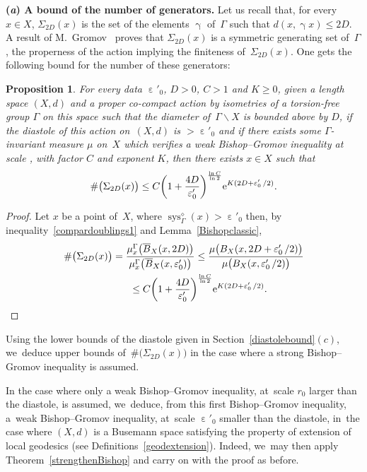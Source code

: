 \documentclass[10pt,a4paper]{amsart}
\numberwithin{equation}{section}
\newtheorem{prop}[theor]{Proposition}
\newcommand{\sys}{\operatorname{sys}}
\newcommand{\g}{\operatorname{\gamma}}
\newcommand{\e}{\operatorname{\varepsilon}}
\begin{document}
\medskip\noindent
{\bf (\emph{a}) A bound of the number of generators.}
Let us recall that, for every $x \in X$, $\Sigma_{2 D} (x)$ is the set of
the elements $\g$ of~$\Gamma$ such that $d(x, \g x) \le 2 D$. A result of M.~Gromov~\cite[Proposition~3.22]{Gr1} proves that $\Sigma_{2 D} (x)$ is a symmetric generating set of~$\Gamma $, the properness of
the action implying the finiteness of~$\Sigma_{2 D} (x) $. One gets the following bound for the number of these generators:

\begin{prop}%
For every data $\e'_0$, $D >0$, $C > 1 $ and $K\ge 0$, given a length space
$(X,d)$ and a proper co-compact action by isometries of a torsion-free group
$\Gamma $ on this space such that the diameter of~$\Gamma \backslash X$ is bounded above by $D$, if the diastole of this action
on~$(X,d)$ is $ > \e'_0$ and if there exists some
$\Gamma$-invariant measure $\mu$ on~$X$ which verifies a weak Bishop--Gromov inequality at scale \smash{$\frac{\e'_0}{2}$}, with factor $C$ and exponent $K$, then
there exists $x \in X$ such that
\begin{gather*}
 \# \big( \Sigma_{2 D} (x) \big) \le C \bigg(1 + \dfrac{4 D }{\e'_0}\bigg)^{\frac{\ln C}{\ln 2}} {\rm e}^{K (2 D + \e'_0/2)}.
 \end{gather*}
\end{prop}

\begin{proof}
Let $x$ be a point of~$X$, where $\sys^{\diamond}_\Gamma (x) > \e'_0$ then, by inequality~\eqref{compardoublings1} and Lemma~\ref{Bishopclassic},
\begin{gather*}
\# \big( \Sigma_{2 D} (x) \big) = \dfrac{\mu_{x}^{\Gamma} \big( \overline B_X (x, 2 D) \big)}{\mu_{x}^{\Gamma} \big( \overline B_X (x, \e'_0) \big)} \le \dfrac{\mu \big( B_X (x, 2 D + \e'_0/2) \big)}{\mu \big( B_X (x, \e'_0/2) \big)}
\\ \hphantom{\# \big( \Sigma_{2 D} (x) \big)}
{}\le C \bigg(1 + \dfrac{4 D }{\e'_0}\bigg)^{\frac{\ln C}{\ln 2}} {\rm e}^{K (2 D + \e'_0/2)}.
\tag*{\qed}
\end{gather*}
\renewcommand{\qed}{}
\end{proof}

Using the lower bounds of the diastole given in Section~\ref{diastolebound}$(c)$, we~deduce upper bounds of~$\# \big(\Sigma_{2 D} (x) \big) $ in
the case where a strong Bishop--Gromov inequality is assumed.

In the case where only a weak Bishop--Gromov inequality, at~scale $r_0 $ larger than the diastole, is assumed, we~deduce, from this first Bishop--Gromov inequality, a~weak Bishop--Gromov inequality, at~scale $\e'_0 $ smaller than the diastole, in~the case where $(X,d)$ is a Busemann space satisfying the property of extension of local geodesics (see Definitions~\ref{geodextension}). Indeed, we~may then apply Theorem~\ref{strengthenBishop} and carry on with
the proof as before.
\end{document}
